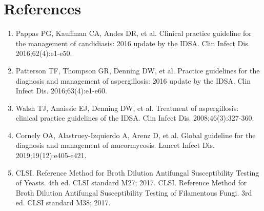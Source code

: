 \section*{References}
\begin{enumerate}
  \item Pappas PG, Kauffman CA, Andes DR, et al. Clinical practice guideline for the management of candidiasis: 2016 update by the IDSA. Clin Infect Dis. 2016;62(4):e1-e50.
  \item Patterson TF, Thompson GR, Denning DW, et al. Practice guidelines for the diagnosis and management of aspergillosis: 2016 update by the IDSA. Clin Infect Dis. 2016;63(4):e1-e60.
  \item Walsh TJ, Anaissie EJ, Denning DW, et al. Treatment of aspergillosis: clinical practice guidelines of the IDSA. Clin Infect Dis. 2008;46(3):327-360.
  \item Cornely OA, Alastruey-Izquierdo A, Arenz D, et al. Global guideline for the diagnosis and management of mucormycosis. Lancet Infect Dis. 2019;19(12):e405-e421.
  \item CLSI. Reference Method for Broth Dilution Antifungal Susceptibility Testing of Yeasts. 4th ed. CLSI standard M27; 2017. CLSI. Reference Method for Broth Dilution Antifungal Susceptibility Testing of Filamentous Fungi. 3rd ed. CLSI standard M38; 2017.
\end{enumerate}

\clearpage
